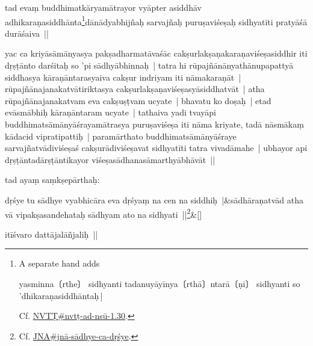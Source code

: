 \documentclass[article,a4paper]{memoir}
\begin{document}
	  
	

	  \pstart tad evaṃ buddhimatkā\-ryamā\-trayor vyā\-pter asiddhā\-v adhikaraṇasiddhā\-nta\footnote{A separate hand adds \begin{sanskrit}yasminna〔rthe〕 sidhyanti tadanuyā\-yī\-nya〔rthā\-〕ntarā\-〔ṇi〕 sidhyanti so 'dhikaraṇasiddhā\-ntaḥ |\end{sanskrit} Cf. \href{NVTṬ\#nvtṭ-ad-nsū_1-1.30}{NVTṬ\#nvtṭ-ad-nsū\--1.30}.}dā\-nā\-dyabhijñaḥ sarvajñaḥ puruṣaviśeṣaḥ sidhyatī\-ti pratyā\-śā\- durā\-śaiva ||
	\pend
      
	  
	

	  \pstart yac ca kriyā\-sā\-mā\-nyasya pakṣadharmatā\-vaśā\-c cakṣurlakṣaṇakaraṇaviśeṣasiddhir iti dṛṣṭā\-nto darśitaḥ so 'pi sā\-dhyā\-bhinnaḥ | tatra hi rū\-pajñā\-nā\-nyathā\-nupapattyā\- siddhasya kā\-raṇā\-ntarasyaiva cakṣur indriyam iti nā\-makaraṇā\-t | rū\-pajñā\-najanakatvā\-tiriktasya cakṣurlakṣaṇaviśeṣasyā\-siddhatvā\-t | atha rū\-pajñā\-najanakatvam eva cakṣuṣṭvam ucyate | bhavatu ko doṣaḥ | etad evā\-smā\-bhiḥ kā\-raṇā\-ntaram ucyate | tathaiva yadi tvayā\-pi buddhimatsā\-mā\-nyā\-śrayamā\-trasya puruṣaviśeṣa iti nā\-ma kriyate, tadā\- nā\-smā\-kaṃ kā\-dacid vipratipattiḥ | paramā\-rthato buddhimatsā\-mā\-nyā\-śraye sarvajñatvā\-diviśeṣaś cakṣurā\-diviśeṣavat sidhyatī\-ti tatra vivadā\-mahe | ubhayor api dṛṣṭā\-ntadā\-rṣṭā\-ntikayor viśeṣasā\-dhanasā\-marthyā\-bhā\-vā\-t ||
	\pend
      
	  
	

	  \pstart tad ayaṃ saṃkṣepā\-rthaḥ:
	\pend
      
	    
	    \stanza[\smallbreak]
dṛśye tu sā\-dhye vyabhicā\-ra eva dṛśyaṃ na cen na siddhiḥ |&sā\-dhā\-raṇatvā\-d atha vā\- vipakṣasandehataḥ sā\-dhyam ato na sidhyati ||\footnote{Cf. \href{JNA\#jnā-sādhye-ca-dṛśye}{JNA\#jnā\--sā\-dhye-ca-dṛśye}.}\&[\smallbreak]


	

	  \pstart itī\-śvaro dattā\-jalā\-ñjaliḥ ||
	\pend
      \label{īsd-sādhanasvarūpa}
	  
	
\end{document}
